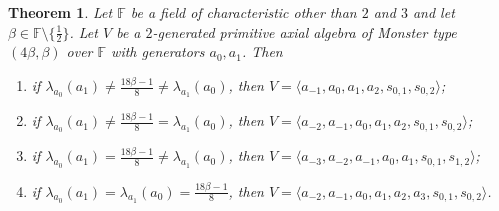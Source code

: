 \documentclass[a4paper]{amsart}
\newtheorem{theorem}[lemma]{Theorem}
\newcommand{\F}{{\mathbb F}}
\newcommand{\bt}{\beta}
\begin{document}
\begin{theorem}\label{newth}
Let $\F$ be a field of characteristic other than $2$ and $3$ and let $\bt\in \F\setminus \{ \frac{1}{2}\}$.
Let $V$ be a $2$-generated primitive axial algebra of Monster type $(4\bt, \bt)$ over $\F$ with generators $a_0, a_1$. Then 
\begin{enumerate}
\item if $\lambda_{a_0}(a_1)\neq \frac{18\bt-1}{8}\neq\lambda_{a_1}(a_0)$, then $V=\langle a_{-1}, a_0, a_1, a_2, s_{0,1}, s_{0,2} \rangle$;
\item if $\lambda_{a_0}(a_1)\neq \frac{18\bt-1}{8}=\lambda_{a_1}(a_0)$, then $V=\langle a_{-2}, a_{-1}, a_0, a_1, a_2, s_{0,1}, s_{0,2} \rangle$;
\item if $\lambda_{a_0}(a_1)= \frac{18\bt-1}{8}\neq \lambda_{a_1}(a_0)$, then $V=\langle a_{-3}, a_{-2}, a_{-1}, a_0, a_1, s_{0,1}, s_{1,2} \rangle$;
\item if $\lambda_{a_0}(a_1)= \lambda_{a_1}(a_0)=\frac{18\bt-1}{8}$, then $V=\langle a_{-2}, a_{-1}, a_0, a_1, a_2, a_3, s_{0,1}, s_{0,2}\rangle$.
\end{enumerate}
\end{theorem}
\end{document}
